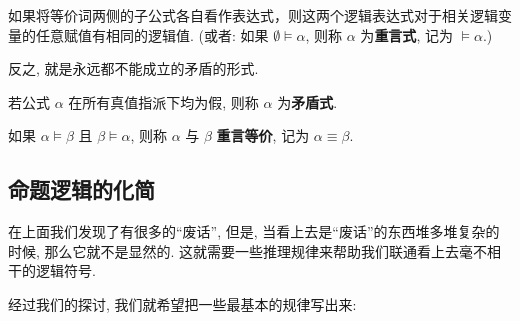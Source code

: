       \begin{definition}
        如果将等价词两侧的子公式各自看作表达式，则这两个逻辑表达式对于相关逻辑变量的任意赋值有相同的逻辑值. 
        (或者: 如果 $\emptyset \models \alpha$, 则称 $\alpha$ 为{\bf 重言式},
        记为 $\models \alpha$.)
      \end{definition}

      反之, 就是永远都不能成立的矛盾的形式. 
      
      \begin{definition}
        若公式 $\alpha$ 在所有真值指派下均为假, 则称 $\alpha$ 为{\bf 矛盾式}. 
      \end{definition}

      \begin{definition}
        如果 $\alpha \models \beta$ 且 $\beta \models \alpha$,
        则称 $\alpha$ 与 $\beta$ {\bf 重言等价}, 记为 $\alpha \equiv \beta$. 
      \end{definition}
      
      
\subsection{命题逻辑的化简}

在上面我们发现了有很多的``废话'', 但是, 当看上去是``废话''的东西堆多堆复杂的时候, 那么它就不是显然的. 这就需要一些推理规律来帮助我们联通看上去毫不相干的逻辑符号. 

经过我们的探讨, 我们就希望把一些最基本的规律写出来: 

